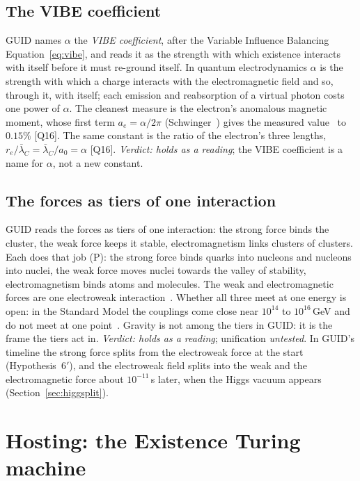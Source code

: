 \documentclass[11pt,a4paper]{article}
\theoremstyle{definition}
\theoremstyle{remark}
\newcommand{\chk}[1]{\textsf{[#1]}}
\newcommand{\tagP}{\textsf{(P)}}
\newcommand{\nw}[1]{{\color{newc}#1}}
\newcommand{\vtag}{{\color{newc}\textsf{\scriptsize[v5.1]}}}
\theoremstyle{definition}
\begin{document}
\subsection{The VIBE coefficient}

GUID names $\alpha$ the \emph{VIBE coefficient}, after the Variable Influence Balancing Equation~\eqref{eq:vibe}, and reads it as the strength
with which existence interacts with itself before it must re-ground itself. In quantum electrodynamics $\alpha$ is the strength with which
a charge interacts with the electromagnetic field and so, through it, with itself; each emission and reabsorption of a virtual photon costs
one power of $\alpha$. The cleanest measure is the electron's anomalous magnetic moment, whose first term $a_e=\alpha/2\pi$
(Schwinger~\cite{schwinger}) gives the measured value~\cite{fan} to $0.15\%$ \chk{Q16}. The same constant is the ratio of the electron's
three lengths, $r_e/\bar\lambda_C=\bar\lambda_C/a_0=\alpha$ \chk{Q16}. \emph{Verdict: holds as a reading}; the VIBE coefficient is a name for
$\alpha$, not a new constant.

\subsection{The forces as tiers of one interaction}

GUID reads the forces as tiers of one interaction: the strong force binds the cluster, the weak force keeps it stable, electromagnetism
links clusters of clusters. Each does that job \tagP: the strong force binds quarks into nucleons and nucleons into nuclei, the weak force
moves nuclei towards the valley of stability, electromagnetism binds atoms and molecules. The weak and electromagnetic forces are one
electroweak interaction~\cite{glashow,weinberg67,salam}. Whether all three meet at one energy is open: in the Standard Model the couplings
come close near $10^{14}$ to $10^{16}$\,GeV and do not meet at one point~\cite{amaldi}. Gravity is not among the tiers in GUID: it is the
frame the tiers act in. \emph{Verdict: holds as a reading}; unification \emph{untested}. \nw{\vtag{} In GUID's timeline the
strong force splits from the electroweak force at the start (Hypothesis~6$'$), and the electroweak field splits into the weak and the
electromagnetic force about $10^{-11}$\,s later, when the Higgs vacuum appears (Section~\ref{sec:higgsplit}).}

\section{Hosting: the Existence Turing machine}\label{sec:host}
\end{document}
